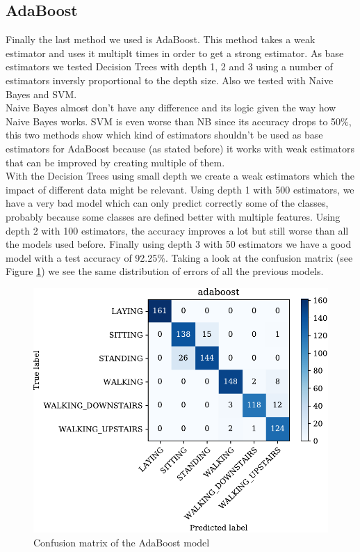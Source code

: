 \documentclass[conference,a4paper]{IEEEtran}
\begin{document}
\subsection{AdaBoost}
Finally the last method we used is AdaBoost. This method takes a weak estimator and uses it multiplt times in order to get a strong estimator. As base estimators we tested Decision Trees with depth 1, 2 and 3 using a number of estimators inversly proportional to the depth size. Also we tested with Naive Bayes and SVM. \\
Naive Bayes almost don't have any difference and its logic given the way how Naive Bayes works. SVM is even worse than NB since its accuracy drops to 50\%, this two methods show which kind of estimators shouldn't be used as base estimators for AdaBoost because (as stated before) it works with weak estimators that can be improved by creating multiple of them. \\ 
\newpage
With the Decision Trees using small depth we create a weak estimators which the impact of different data might be relevant. Using depth 1 with 500 estimators, we have a very bad model which can only predict correctly some of the classes, probably because some classes are defined better with multiple features. Using depth 2 with 100 estimators, the accuracy improves a lot but still worse than all the models used before. Finally using depth 3 with 50 estimators we have a good model with a test accuracy of 92.25\%. Taking a look at the confusion matrix (see Figure \ref{fig:cm_ab}) we see the same distribution of errors of all the previous models.

\begin{figure}[htbp]
    \centering
    \includegraphics[width=0.8\columnwidth]{../plots/cm_adaboost.pdf}
    \caption{Confusion matrix of the AdaBoost model}
    \label{fig:cm_ab}
\end{figure}
\end{document}
